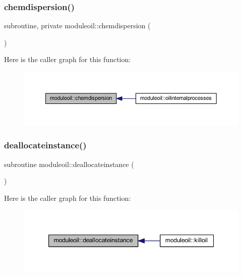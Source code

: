\subsubsection{\texorpdfstring{chemdispersion()}{chemdispersion()}}
{\footnotesize\ttfamily subroutine, private moduleoil\+::chemdispersion (\begin{DoxyParamCaption}{ }\end{DoxyParamCaption})\hspace{0.3cm}{\ttfamily [private]}}

Here is the caller graph for this function\+:\nopagebreak
\begin{figure}[H]
\begin{center}
\leavevmode
\includegraphics[width=350pt]{namespacemoduleoil_a0787ef4a57eb2967c2704c9a3fe30dbf_icgraph}
\end{center}
\end{figure}
\mbox{\label{namespacemoduleoil_ae94c3b6ecc29b85e8ccbddf231f67646}} 
\subsubsection{\texorpdfstring{deallocateinstance()}{deallocateinstance()}}
{\footnotesize\ttfamily subroutine moduleoil\+::deallocateinstance (\begin{DoxyParamCaption}{ }\end{DoxyParamCaption})\hspace{0.3cm}{\ttfamily [private]}}

Here is the caller graph for this function\+:\nopagebreak
\begin{figure}[H]
\begin{center}
\leavevmode
\includegraphics[width=347pt]{namespacemoduleoil_ae94c3b6ecc29b85e8ccbddf231f67646_icgraph}
\end{center}
\end{figure}
\mbox{\label{namespacemoduleoil_a9b26683d1a6211ffa180e7c4004596be}} 
